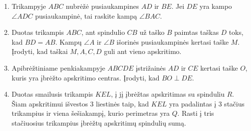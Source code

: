 \begin{enumerate}
\item Trikampyje $ABC$ nubrėžė pusiaukampines $AD$ ir $BE$.
  Jei $DE$ yra kampo $\angle ADC$ pusiaukampinė, tai raskite
  kampą $\angle BAC$. 
\item Duotas trikampis $ABC$, ant spindulio $CB$ už taško
  $B$ paimtas taškas $D$ toks, kad $BD=AB$. Kampų $\angle A$
  ir $\angle B$ išorinės pusiaukampinės kertasi taške $M$.
  Įrodyti, kad taškai $M,A,C,D$ guli ant vieno apskritimo.
\item Apibrėžtiniame penkiakampyje $ABCDE$ įstrižainės $AD$
  ir $CE$ kertasi taške $O$, kuris yra įbrėžto apskritimo
  centras. Įrodyti, kad $BO \perp{DE}$.
\item Duotas smailusis  trikampis $KEL$, į jį įbrėžtas
  apskritimas su spinduliu $R$. Šiam apskritimui išvestos 3
  liestinės taip, kad $KEL$ yra padalintas į 3 stačius
  trikampius ir viena šešiakampį, kurio perimetras yra $Q$.
  Rasti į tris stačiuosius trikampius įbrėžtų apskritimų
  spindulių sumą. 

\end{enumerate}
